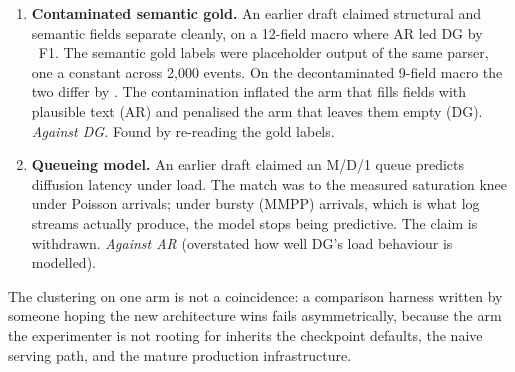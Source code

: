 \begin{enumerate}
either architecture). Found by re-reading the gold-generation script. \item \textbf{Contaminated semantic gold.} An earlier draft claimed structural
and semantic fields separate cleanly, on a 12-field macro where AR led DG by
\twelveGap\ F1. The semantic gold labels were placeholder output of the same
parser, one a constant across 2{,}000 events. On the decontaminated 9-field
macro the two differ by \qualityGap. The contamination inflated the arm that
fills fields with plausible text (AR) and penalised the arm that leaves them
empty (DG). \emph{Against DG.} Found by re-reading the gold labels. \item \textbf{Queueing model.} An earlier draft claimed an M/D/1 queue
predicts diffusion latency under load. The match was to the measured
saturation knee under Poisson arrivals; under bursty (MMPP) arrivals, which is
what log streams actually produce, the model stops being predictive. The claim
is withdrawn. \emph{Against AR} (overstated how well DG's load behaviour is
modelled).
\end{enumerate} The clustering on one arm is not a coincidence: a comparison harness written by
someone hoping the new architecture wins fails asymmetrically, because the
arm the experimenter is not rooting for inherits the checkpoint defaults, the
naive serving path, and the mature production infrastructure.
